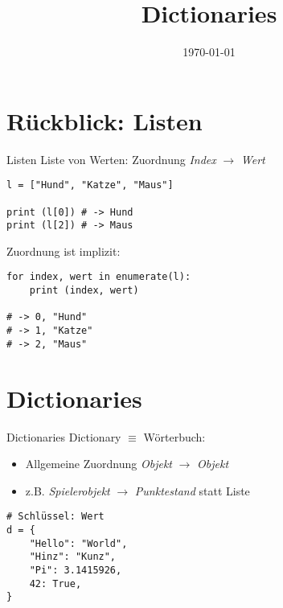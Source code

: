



\title{Dictionaries}

\date{\today}




\maketitle

\section{Rückblick: Listen}

\begin{frame}[fragile]{Listen}
    Liste von Werten: Zuordnung \emph{Index} $\rightarrow$ \emph{Wert} 
    \begin{lstlisting}
l = ["Hund", "Katze", "Maus"]

print (l[0]) # -> Hund
print (l[2]) # -> Maus
    \end{lstlisting}

    Zuordnung ist implizit:
    \begin{lstlisting}
for index, wert in enumerate(l):
    print (index, wert)

# -> 0, "Hund"
# -> 1, "Katze"
# -> 2, "Maus"
    \end{lstlisting}
\end{frame}

\section{Dictionaries}

\begin{frame}[fragile]{Dictionaries}
    Dictionary $\equiv$ \glqq Wörterbuch\grqq:\\
    \begin{itemize}
        \item Allgemeine Zuordnung \emph{Objekt} $\rightarrow$ \emph{Objekt}
        \item z.B. \emph{Spielerobjekt} $\rightarrow$ \emph{Punktestand} statt Liste 
    \end{itemize}
    \begin{lstlisting}
# Schlüssel: Wert
d = {
    "Hello": "World",
    "Hinz": "Kunz",
    "Pi": 3.1415926,
    42: True,
}
    \end{lstlisting}
\end{frame}

